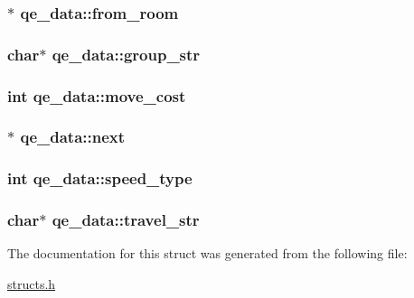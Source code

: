\hypertarget{structqe__data_a16f8afbea646659a38b342114635b05b}{
\subsubsection[{from\-\_\-room}]{$\ast$ qe\-\_\-data\-::from\-\_\-room}}\label{structqe__data_a16f8afbea646659a38b342114635b05b}
\hypertarget{structqe__data_a3ad2455b0ef04aa965c3f33d16814bfc}{
\subsubsection[{group\-\_\-str}]{\setlength{\rightskip}{0pt plus 5cm}char$\ast$ qe\-\_\-data\-::group\-\_\-str}}\label{structqe__data_a3ad2455b0ef04aa965c3f33d16814bfc}
\hypertarget{structqe__data_aa0fa1722c4952fd1842d8efd58fd799c}{
\subsubsection[{move\-\_\-cost}]{\setlength{\rightskip}{0pt plus 5cm}int qe\-\_\-data\-::move\-\_\-cost}}\label{structqe__data_aa0fa1722c4952fd1842d8efd58fd799c}
\hypertarget{structqe__data_a6d7a520f4b25f891db6dbecbf27de2c3}{
\subsubsection[{next}]{$\ast$ qe\-\_\-data\-::next}}\label{structqe__data_a6d7a520f4b25f891db6dbecbf27de2c3}
\hypertarget{structqe__data_aa070f528c6714b8ab013d256144affa0}{
\subsubsection[{speed\-\_\-type}]{\setlength{\rightskip}{0pt plus 5cm}int qe\-\_\-data\-::speed\-\_\-type}}\label{structqe__data_aa070f528c6714b8ab013d256144affa0}
\hypertarget{structqe__data_a79634c011f099c5c9f31572fcf60683b}{
\subsubsection[{travel\-\_\-str}]{\setlength{\rightskip}{0pt plus 5cm}char$\ast$ qe\-\_\-data\-::travel\-\_\-str}}\label{structqe__data_a79634c011f099c5c9f31572fcf60683b}


The documentation for this struct was generated from the following file\-:\begin{DoxyCompactItemize}
\item 
\hyperlink{structs_8h}{structs.\-h}\end{DoxyCompactItemize}
